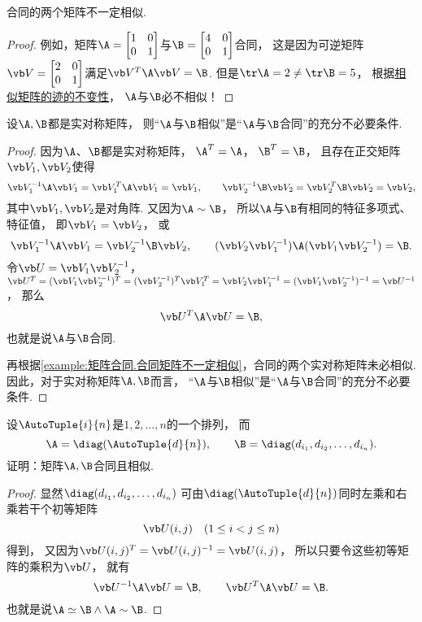 \begin{proposition}\label{example:矩阵合同.合同矩阵不一定相似}
合同的两个矩阵不一定相似.
\begin{proof}
例如，矩阵\(\A=\begin{bmatrix}
	1 & 0 \\
	0 & 1
\end{bmatrix}\)与\(\B=\begin{bmatrix}
	4 & 0 \\
	0 & 1
\end{bmatrix}\)合同，
这是因为可逆矩阵\(\Q=\begin{bmatrix}
	2 & 0 \\
	0 & 1
\end{bmatrix}\)满足\(\Q^T\A\Q=\B\).
但是\(\tr\A=2 \neq \tr\B = 5\)，
根据\hyperref[theorem:特征值与特征向量.相似矩阵的迹的不变性]{相似矩阵的迹的不变性}，
\(\A\)与\(\B\)必不相似！
\end{proof}
\end{proposition}

\begin{proposition}\label{theorem:二次型.实对称矩阵相似必合同}
设\(\A,\B\)都是实对称矩阵，
则“\(\A\)与\(\B\)相似”是“\(\A\)与\(\B\)合同”的充分不必要条件.
\begin{proof}
因为\(\A\)、\(\B\)都是实对称矩阵，
\(\A^T=\A\)，
\(\B^T=\B\)，
且存在正交矩阵\(\Q_1,\Q_2\)使得\[
	\Q_1^{-1} \A \Q_1 = \Q_1^T \A \Q_1 = \V_1,
	\qquad
	\Q_2^{-1} \B \Q_2 = \Q_2^T \B \Q_2 = \V_2,
\]
其中\(\V_1,\V_2\)是对角阵.
又因为\(\A\sim\B\)，
所以\(\A\)与\(\B\)有相同的特征多项式、特征值，
即\(\V_1=\V_2\)，
或\[
	\Q_1^{-1} \A \Q_1 = \Q_2^{-1} \B \Q_2,
	\qquad
	(\Q_2 \Q_1^{-1}) \A (\Q_1 \Q_2^{-1}) = \B.
\]
令\(\P = \Q_1 \Q_2^{-1}\)，
\(\P^T = (\Q_1 \Q_2^{-1})^T
= (\Q_2^{-1})^T \Q_1^T
= \Q_2 \Q_1^{-1}
= (\Q_1 \Q_2^{-1})^{-1}
= \P^{-1}\)，
那么\[
	\P^T \A \P = \B,
\]
也就是说\(\A\)与\(\B\)合同.

再根据\cref{example:矩阵合同.合同矩阵不一定相似}，合同的两个实对称矩阵未必相似.
因此，对于实对称矩阵\(\A,\B\)而言，
“\(\A\)与\(\B\)相似”是“\(\A\)与\(\B\)合同”的充分不必要条件.
\end{proof}
\end{proposition}

\begin{example}
设\(\AutoTuple{i}{n}\)是\(1,2,\dotsc,n\)的一个排列，
而\[
	\A=\diag(\AutoTuple{d}{n}),
	\qquad
	\B=\diag(d_{i_1},d_{i_2},\dotsc,d_{i_n}).
\]
证明：矩阵\(\A,\B\)合同且相似.
\begin{proof}
显然\(\diag(d_{i_1},d_{i_2},\dotsc,d_{i_n})\)
可由\(\diag(\AutoTuple{d}{n})\)同时左乘和右乘若干个初等矩阵\[
	\P(i,j) \quad(1 \leq i < j \leq n)
\]得到，
又因为\(\P(i,j)^T = \P(i,j)^{-1} = \P(i,j)\)，
所以只要令这些初等矩阵的乘积为\(\P\)，
就有\[
	\P^{-1} \A \P = \B,
	\qquad
	\P^T \A \P = \B.
\]
也就是说\(\A\simeq\B\land\A\sim\B\).
\end{proof}
\end{example}

